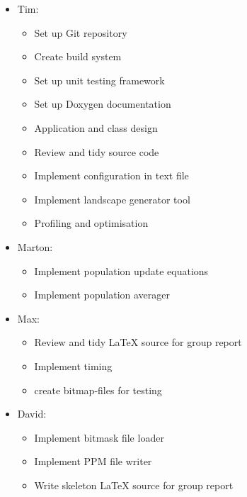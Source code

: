 \begin{itemize}
 \item Tim:
  \begin{itemize}
        \item Set up Git repository
	\item Create build system
	\item Set up unit testing framework
	\item Set up Doxygen documentation
	\item Application and class design
	\item Review and tidy source code
	\item Implement configuration in text file
	\item Implement landscape generator tool
	\item Profiling and optimisation
   \end{itemize}

  \item Marton:
    \begin{itemize}
	\item Implement population update equations
	\item Implement population averager
    \end{itemize}

 \item Max:
  \begin{itemize}
        \item Review and tidy LaTeX source for group report
	\item Implement timing
	\item create bitmap-files for testing
   \end{itemize}

\item David:
  \begin{itemize}
	\item Implement bitmask file loader
	\item Implement PPM file writer
	\item Write skeleton LaTeX source for group report
  \end{itemize}



\end{itemize}
 